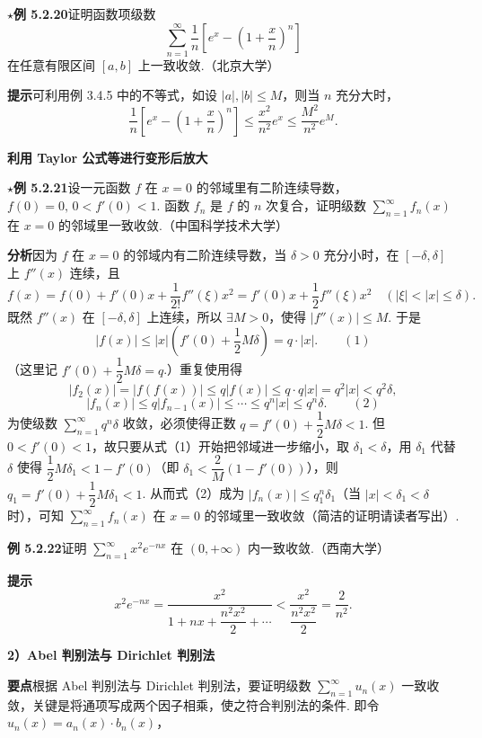 \documentclass[UTF8, 12pt, fontset=fandol, oneside]{ctexart}
\begin{document}
\noindent\textbf{$\star$例 5.2.20}\quad 证明函数项级数
\[
  \sum_{n=1}^{\infty}\frac1n\left[e^x-\left(1+\frac{x}{n}\right)^n\right]
\]
在任意有限区间 $[a,b]$ 上一致收敛.（北京大学）

\noindent\textbf{提示}\quad 可利用例 3.4.5 中的不等式，如设 $|a|,|b|\le M$，则当 $n$ 充分大时，
\[
  \frac1n\left[e^x-\left(1+\frac{x}{n}\right)^n\right]
  \le \frac{x^2}{n^2}e^x\le \frac{M^2}{n^2}e^M.
\]

\noindent\textbf{利用 Taylor 公式等进行变形后放大}

\noindent\textbf{$\star$例 5.2.21}\quad 设一元函数 $f$ 在 $x=0$ 的邻域里有二阶连续导数，
$f(0)=0,\,0<f'(0)<1$. 函数 $f_n$ 是 $f$ 的 $n$ 次复合，证明级数
$\displaystyle\sum_{n=1}^{\infty}f_n(x)$ 在 $x=0$ 的邻域里一致收敛.（中国科学技术大学）

\noindent\textbf{分析}\quad 因为 $f$ 在 $x=0$ 的邻域内有二阶连续导数，当 $\delta>0$ 充分小时，在
$[-\delta,\delta]$ 上 $f''(x)$ 连续，且
\[
  f(x)=f(0)+f'(0)x+\frac1{2!}f''(\xi)x^2
  =f'(0)x+\frac12 f''(\xi)x^2\quad(|\xi|<|x|\le\delta).
\]
既然 $f''(x)$ 在 $[-\delta,\delta]$ 上连续，所以 $\exists M>0$，使得
$|f''(x)|\le M$. 于是
\[
  |f(x)|\le |x|\left(f'(0)+\frac12M\delta\right)=q\cdot |x|.
\qquad(1)
\]
（这里记 $f'(0)+\dfrac12M\delta=q$.）重复使用得
\[
  |f_2(x)|=|f(f(x))|\le q|f(x)|\le q\cdot q|x|=q^2|x|<q^2\delta,
\]
\[
  |f_n(x)|\le q|f_{n-1}(x)|\le\cdots\le q^n|x|\le q^n\delta.
\qquad(2)
\]
为使级数 $\displaystyle\sum_{n=1}^{\infty}q^n\delta$ 收敛，必须使得正数
$q=f'(0)+\dfrac12M\delta<1$. 但 $0<f'(0)<1$，故只要从式（1）开始把邻域进一步缩小，取
$\delta_1<\delta$，用 $\delta_1$ 代替 $\delta$ 使得
$\dfrac12M\delta_1<1-f'(0)$（即
$\delta_1<\dfrac2M(1-f'(0))$），则
$q_1=f'(0)+\dfrac12M\delta_1<1$. 从而式（2）成为
$|f_n(x)|\le q_1^n\delta_1$（当 $|x|<\delta_1<\delta$ 时），可知
$\displaystyle\sum_{n=1}^{\infty}f_n(x)$ 在 $x=0$ 的邻域里一致收敛（简洁的证明请读者写出）.

\noindent\textbf{例 5.2.22}\quad 证明 $\displaystyle\sum_{n=1}^{\infty}x^2e^{-nx}$ 在
$(0,+\infty)$ 内一致收敛.（西南大学）

\noindent\textbf{提示}\quad
\[
  x^2e^{-nx}
  =\frac{x^2}{1+nx+\dfrac{n^2x^2}{2}+\cdots}
  <\frac{x^2}{\dfrac{n^2x^2}{2}}=\frac2{n^2}.
\]

\noindent\textbf{2）Abel 判别法与 Dirichlet 判别法}

\noindent\textbf{要点}\quad 根据 Abel 判别法与 Dirichlet 判别法，要证明级数
$\displaystyle\sum_{n=1}^{\infty}u_n(x)$ 一致收敛，关键是将通项写成两个因子相乘，使之符合判别法的条件. 即令
$u_n(x)=a_n(x)\cdot b_n(x)$，
\end{document}
